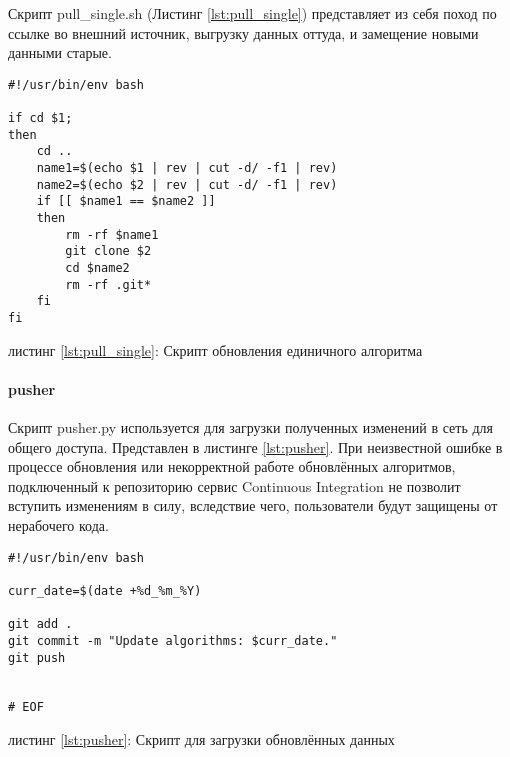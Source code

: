 Скрипт {\small pull\_single.sh} (Листинг \ref{lst:pull_single}) представляет из
себя поход по ссылке во внешний источник, выгрузку данных оттуда, и замещение
новыми данными старые.

\begin{center}
\begin{lstlisting}
#!/usr/bin/env bash

if cd $1;
then
    cd ..
    name1=$(echo $1 | rev | cut -d/ -f1 | rev)
    name2=$(echo $2 | rev | cut -d/ -f1 | rev)
    if [[ $name1 == $name2 ]]
    then
        rm -rf $name1
        git clone $2
        cd $name2
        rm -rf .git*
    fi
fi
\end{lstlisting}\label{lst:pull_single}
    листинг \ref{lst:pull_single}: Скрипт обновления единичного алгоритма
\end{center}


\paragraph{pusher}

Скрипт {\small pusher.py} используется для загрузки полученных изменений в сеть
для общего доступа. Представлен в листинге \ref{lst:pusher}. При неизвестной
ошибке в процессе обновления или некорректной работе обновлённых алгоритмов,
подключенный к репозиторию сервис Continuous Integration не позволит вступить
изменениям в силу, вследствие чего, пользователи будут защищены от нерабочего
кода.

\begin{center}
\begin{lstlisting}
#!/usr/bin/env bash

curr_date=$(date +%d_%m_%Y)

git add .
git commit -m "Update algorithms: $curr_date."
git push


# EOF
\end{lstlisting}\label{lst:pusher}
    листинг \ref{lst:pusher}: Скрипт для загрузки обновлённых данных
\end{center}
